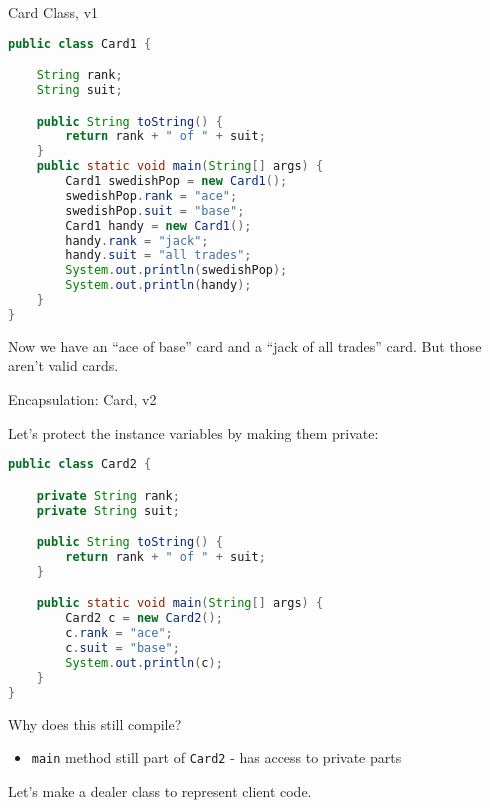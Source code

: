 \documentclass{beamer}
\begin{document}
\begin{frame}[fragile]{Card Class, v1}

\vspace{-.1in}
\begin{lstlisting}[language=Java]
public class Card1 {

    String rank;
    String suit;

    public String toString() {
        return rank + " of " + suit;
    }
    public static void main(String[] args) {
        Card1 swedishPop = new Card1();
        swedishPop.rank = "ace";
        swedishPop.suit = "base";
        Card1 handy = new Card1();
        handy.rank = "jack";
        handy.suit = "all trades";
        System.out.println(swedishPop);
        System.out.println(handy);
    }
}
\end{lstlisting}
\vspace{-.1in}
Now we have an ``ace of base'' card and a ``jack of all trades'' card.  But those aren't valid cards.


\end{frame}

\begin{frame}[fragile]{Encapsulation: Card, v2}

\vspace{-.05in}
Let's protect the instance variables by making them private:
\begin{lstlisting}[language=Java]
public class Card2 {

    private String rank;
    private String suit;

    public String toString() {
        return rank + " of " + suit;
    }

    public static void main(String[] args) {
        Card2 c = new Card2();
        c.rank = "ace";
        c.suit = "base";
        System.out.println(c);
    }
}
\end{lstlisting}
\vspace{-.05in}
Why does this still compile?

\begin{itemize}
\item {\tt main} method still part of {\tt Card2} - has access to private parts
\end{itemize}
Let's make a dealer class to represent client code.

\end{frame}
\end{document}

